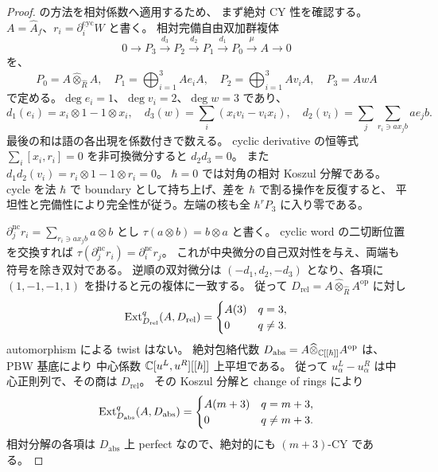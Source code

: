 \begin{proof}
\cite[Proposition 8.1.1(i)の証明]{EG}の方法を相対係数へ適用するため、
まず絶対 CY 性を確認する。
$A=\widehat A_f$、$r_i=\partial_i^{\mathrm{cyc}}W$ と書く。
相対完備自由双加群複体
\begin{equation}
0\longrightarrow P_3\xrightarrow{d_3}P_2\xrightarrow{d_2}P_1
\xrightarrow{d_1}P_0\xrightarrow\mu A\longrightarrow0\label{eq:pg-potential-resolution}
\end{equation}
を、
\[
P_0=A\widehat\otimes_{\widehat R}A,\quad
P_1=\bigoplus_{i=1}^3Ae_iA,\quad
P_2=\bigoplus_{i=1}^3Av_iA,\quad P_3=AwA
\]
で定める。$\deg e_i=1$、$\deg v_i=2$、$\deg w=3$ であり、
\[
d_1(e_i)=x_i\otimes1-1\otimes x_i,\quad
 d_3(w)=\sum_i(x_iv_i-v_ix_i),\quad
 d_2(v_i)=\sum_j\sum_{r_i\ni ax_jb}ae_jb.
\]
最後の和は語の各出現を係数付きで数える。
cyclic derivative の恒等式 $\sum_i[x_i,r_i]=0$ を非可換微分すると $d_2d_3=0$。
また $d_1d_2(v_i)=r_i\otimes1-1\otimes r_i=0$。
$\hbar=0$ では対角の相対 Koszul 分解である。
cycle を法 $\hbar$ で boundary として持ち上げ、差を $\hbar$ で割る操作を反復すると、
平坦性と完備性により完全性が従う。左端の核も全 $\hbar^rP_3$ に入り零である。

$\partial_j^{\mathrm{nc}}r_i=\sum_{r_i\ni ax_jb}a\otimes b$ とし
$\tau(a\otimes b)=b\otimes a$ と書く。
cyclic word の二切断位置を交換すれば
$\tau(\partial_j^{\mathrm{nc}}r_i)=\partial_i^{\mathrm{nc}}r_j$。
これが中央微分の自己双対性を与え、両端も符号を除き双対である。
逆順の双対微分は $(-d_1,d_2,-d_3)$ となり、各項に $(1,-1,-1,1)$ を掛けると元の複体に一致する。
従って $D_{\mathrm{rel}}=A\widehat\otimes_{\widehat R}A^{\mathrm{op}}$ に対し
\[
\operatorname{Ext}_{D_{\mathrm{rel}}}^q(A,D_{\mathrm{rel}})=
\begin{cases}A(3)&q=3,\\0&q\neq3.\end{cases}
\]
automorphism による twist はない。
絶対包絡代数 $D_{\mathrm{abs}}=A\widehat\otimes_{\mathbb C[[\hbar]]}A^{\mathrm{op}}$ は、PBW 基底により
中心係数 $\mathbb C[u^L,u^R][[\hbar]]$ 上平坦である。
従って $u_\alpha^L-u_\alpha^R$ は中心正則列で、その商は $D_{\mathrm{rel}}$。
その Koszul 分解と change of rings により
\[
\operatorname{Ext}_{D_{\mathrm{abs}}}^q(A,D_{\mathrm{abs}})=
\begin{cases}A(m+3)&q=m+3,\\0&q\neq m+3.\end{cases}
\]
相対分解の各項は $D_{\mathrm{abs}}$ 上 perfect なので、絶対的にも $(m+3)$-CY である。


\end{proof}
